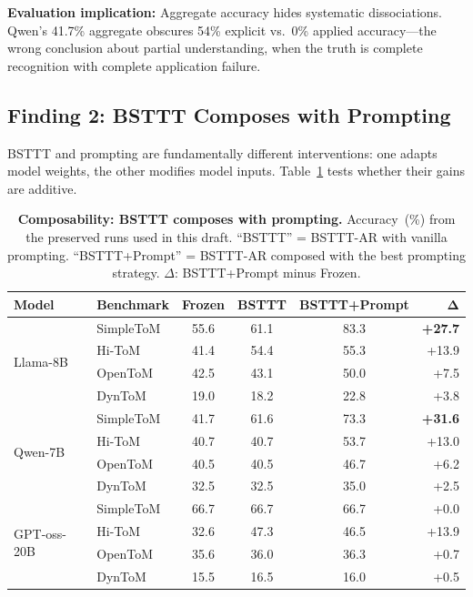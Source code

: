 \begin{tcolorbox}[colback=gray!5, colframe=gray!50, boxrule=0.3pt, left=4pt, right=4pt, top=3pt, bottom=3pt]
\textbf{Evaluation implication:}
Aggregate accuracy hides systematic dissociations.
Qwen's 41.7\% aggregate obscures 54\% explicit vs.\ 0\% applied accuracy---the wrong conclusion about partial understanding, when the truth is complete recognition with complete application failure.
\end{tcolorbox}


\subsection{Finding 2: BSTTT Composes with Prompting}
\label{sec:composability}

BSTTT and prompting are fundamentally different interventions: one adapts model weights, the other modifies model inputs.
Table~\ref{tab:composability} tests whether their gains are additive.

\begin{table}[t]
    \caption{\textbf{Composability: BSTTT composes with prompting.}
    Accuracy~(\%) from the preserved runs used in this draft.
    ``BSTTT'' = BSTTT-AR with vanilla prompting.
    ``BSTTT+Prompt'' = BSTTT-AR composed with the best prompting strategy.
    $\Delta$: BSTTT+Prompt minus Frozen.}
    \label{tab:composability}
    \centering
    \small
    \begin{tabular}{@{}llcccr@{}}
        \toprule
        \textbf{Model} & \textbf{Benchmark} & \textbf{Frozen} & \textbf{BSTTT} & \textbf{BSTTT+Prompt} & $\boldsymbol{\Delta}$ \\
        \midrule
        \multirow{4}{*}{Llama-8B}
            & SimpleToM  & 55.6 & 61.1  & 83.3  & \textbf{+27.7} \\
            & Hi-ToM     & 41.4 & 54.4  & 55.3  & +13.9 \\
            & OpenToM    & 42.5 & 43.1  & 50.0  & +7.5 \\
            & DynToM     & 19.0 & 18.2  & 22.8  & +3.8 \\
        \midrule
        \multirow{4}{*}{Qwen-7B}
            & SimpleToM  & 41.7 & 61.6  & 73.3  & \textbf{+31.6} \\
            & Hi-ToM     & 40.7 & 40.7  & 53.7  & +13.0 \\
            & OpenToM    & 40.5 & 40.5  & 46.7  & +6.2 \\
            & DynToM     & 32.5 & 32.5  & 35.0  & +2.5 \\
        \midrule
        \multirow{4}{*}{GPT-oss-20B}
            & SimpleToM  & 66.7 & 66.7  & 66.7  & +0.0 \\
            & Hi-ToM     & 32.6 & 47.3  & 46.5  & +13.9 \\
            & OpenToM    & 35.6 & 36.0  & 36.3  & +0.7 \\
            & DynToM     & 15.5 & 16.5  & 16.0  & +0.5 \\
        \bottomrule
    \end{tabular}
\end{table}

